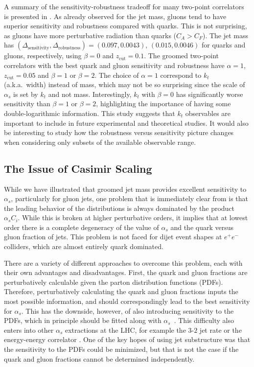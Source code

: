 A summary of the sensitivity-robustness tradeoff for many two-point correlators is presented in .  As already observed for the jet mass, gluons tend to have superior sensitivity and robustness compared with quarks.
%
This is not surprising, as gluons have more perturbative radiation than quarks ($C_A>C_F$).
%
The jet mass has $(\Delta_\text{sensitivity},\Delta_\text{robustness})=(0.097,0.0043)$, $(0.015,0.0046)$ for quarks and gluons, respectively, using $\beta=0$ and $z_\text{cut}=0.1$.
%
The groomed two-point correlators with the best quark and gluon sensitivity and robustness have $\alpha=1$, $z_\text{cut}=0.05$ and $\beta=1$ or $\beta=2$.
%
The choice of $\alpha=1$ correspond to $k_t$ (a.k.a.~width) instead of mass, which may not be so surprising since the scale of $\alpha_s$ is set by $k_t$ and not mass.
%
Interestingly, $k_t$ with $\beta=0$ has significantly worse sensitivity than $\beta=1$ or $\beta=2$, highlighting the importance of having some double-logarithmic information. 
%
This study suggests that $k_t$ observables are important to include in future experimental and theoretical studies.
%
It would also be interesting to study how the robustness versus sensitivity picture changes when considering only subsets of the available observable range.

\subsection{The Issue of Casimir Scaling}
\label{sec:casimir}

While we have illustrated that groomed jet mass provides excellent sensitivity to $\alpha_s$, particularly for gluon jets, one problem that is immediately clear from  is that the leading behavior of the distributions is always dominated by the product $\alpha_s C_i$.
%
While this is broken at higher perturbative orders, it implies that at lowest order there is a complete degeneracy of the value of $\alpha_s$ and the quark versus gluon fraction of jets.
%
This problem is not faced for dijet event shapes at $e^+e^-$ colliders, which are almost entirely quark dominated.

There are a variety of different approaches to overcome this problem, each with their own advantages and disadvantages.
%
First, the quark and gluon fractions are perturbatively calculable given the parton distribution functions (PDFs).
%
Therefore, perturbatively calculating the quark and gluon fractions inputs the most possible information, and should correspondingly lead to the best sensitivity for $\alpha_s$.
%
This has the downside, however, of also introducing sensitivity to the PDFs, which in principle should be fitted along with $\alpha_s$~\cite{Accardi:2016ndt}.
%
This difficulty also enters into other $\alpha_s$ extractions at the LHC, for example the $3$-$2$ jet rate  or the energy-energy correlator .
%
One of the key hopes of using jet substructure was that the sensitivity to the PDFs could be minimized, but that is not the case if the quark and gluon fractions cannot be determined independently.

